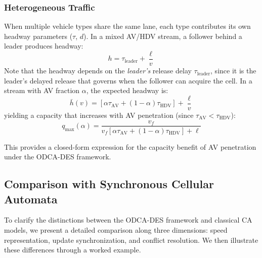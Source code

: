 \documentclass[review,number]{elsarticle}
\begin{document}
\subsubsection{Heterogeneous Traffic}

When multiple vehicle types share the same lane, each type contributes its own headway parameters ($\tau$, $d$). In a mixed AV/HDV stream, a follower behind a leader produces headway:
\begin{equation}
    h = \tau_{\text{leader}} + \frac{\ell}{v}
    \label{eq:mixed_headway}
\end{equation}
Note that the headway depends on the \emph{leader's} release delay $\tau_{\text{leader}}$, since it is the leader's delayed release that governs when the follower can acquire the cell. In a stream with AV fraction $\alpha$, the expected headway is:
\begin{equation}
    \bar{h}(v) = \left[\alpha \tau_{\text{AV}} + (1-\alpha)\tau_{\text{HDV}}\right] + \frac{\ell}{v}
    \label{eq:mixed_avg_headway}
\end{equation}
yielding a capacity that increases with AV penetration (since $\tau_{\text{AV}} < \tau_{\text{HDV}}$):
\begin{equation}
    q_{\max}(\alpha) = \frac{v_f}{v_f\left[\alpha \tau_{\text{AV}} + (1-\alpha)\tau_{\text{HDV}}\right] + \ell}
    \label{eq:mixed_capacity}
\end{equation}

This provides a closed-form expression for the capacity benefit of AV penetration under the ODCA-DES framework.


\subsection{Comparison with Synchronous Cellular Automata}
\label{sec:ca_comparison}

To clarify the distinctions between the ODCA-DES framework and classical CA models, we present a detailed comparison along three dimensions: speed representation, update synchronization, and conflict resolution. We then illustrate these differences through a worked example.
\end{document}
